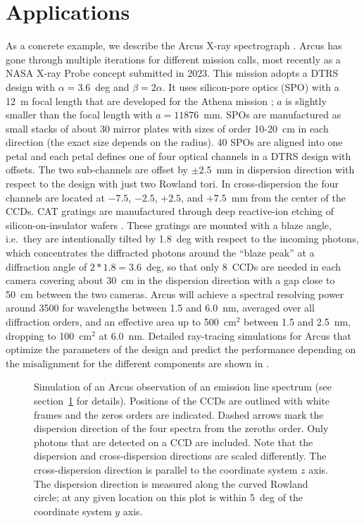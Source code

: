 \documentclass[linenumbers]{aastex631}
\begin{document}
\section{Applications}
\label{sect:applications}
As a concrete example, we describe the Arcus X-ray spectrograph  \citep{2023SPIE12678E..0ES}. Arcus has gone through multiple iterations for different mission calls, most recently as a NASA X-ray Probe concept submitted in 2023. This mission adopts a DTRS design with $\alpha=3.6$~deg and $\beta=2\alpha$. It uses silicon-pore optics (SPO) with a 12~m focal length that are developed for the Athena mission \citep{2023SPIE12679E..05G}; $a$ is slightly smaller than the focal length with $a=11876$~mm. SPOs are manufactured as small stacks of about 30 mirror plates with sizes of order 10-20~cm in each direction (the exact size depends on the radius). 40 SPOs are aligned into one petal and each petal defines one of four optical channels in a DTRS design with offsets. The two sub-channels are offset by $\pm2.5$~mm in dispersion direction with respect to the design with just two Rowland tori. In cross-dispersion the four channels are located at $-7.5$, $-2.5$, $+2.5$, and $+7.5$~mm from the center of the CCDs.
CAT gratings are manufactured through deep reactive-ion etching of silicon-on-insulator wafers \citep{2022ApJ...934..171H,2023SPIE12679E..0LH}. These gratings are mounted with a blaze angle, i.e.\ they are intentionally tilted by 1.8~deg with respect to the incoming photons, which concentrates the diffracted photons around the ``blaze peak'' at a diffraction angle of $2 * 1.8 = 3.6$~deg, so that only 8~CCDs are needed in each camera covering about 30~cm in the dispersion direction with a gap close to 50~cm between the two cameras. Arcus will achieve a spectral resolving power around 3500 for wavelengths between 1.5 and 6.0~nm, averaged over all diffraction orders, and an effective area up to 500~cm$^2$ between 1.5 and 2.5~nm, dropping to 100~cm$^2$ at 6.0~nm. Detailed ray-tracing simulations for Arcus that optimize the parameters of the design and predict the performance depending on the misalignment for the different components are shown in \citet{2017SPIE10397E..0PG,2018SPIE10699E..6FG,2023SPIE12678E..1DG}.


\begin{figure}
    \caption{Simulation of an Arcus observation of an emission line spectrum (see section~\ref{sect:applications} for details). Positions of the CCDs are outlined with white frames and the zeros orders are indicated. Dashed arrows mark the dispersion direction of the four spectra from the zeroths order. Only photons that are detected on a CCD are included. Note that the dispersion and cross-dispersion directions are scaled differently. The cross-dispersion direction is parallel to the coordinate system $z$ axis. The dispersion direction is measured along the curved Rowland circle; at any given location on this plot is within 5~deg of the coordinate system $y$ axis.
        }
    \label{fig:Arcusfull}
\end{figure}
\end{document}
